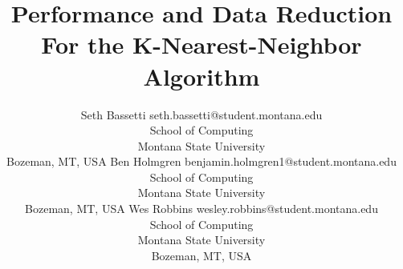 \documentclass[twoside,11pt]{article}
\begin{document}
\title{Performance and Data Reduction For the K-Nearest-Neighbor Algorithm}

\author{\name Seth Bassetti \email seth.bassetti@student.montana.edu \\
       \addr School of Computing\\
       Montana State University\\
       Bozeman, MT, USA
	\AND
	\name Ben Holmgren \email benjamin.holmgren1@student.montana.edu \\
       \addr School of Computing\\
       Montana State University\\
       Bozeman, MT, USA
       \AND
       \name Wes Robbins \email wesley.robbins@student.montana.edu \\
       \addr School of Computing\\
       Montana State University\\
       Bozeman, MT, USA}

\maketitle
\end{document}
